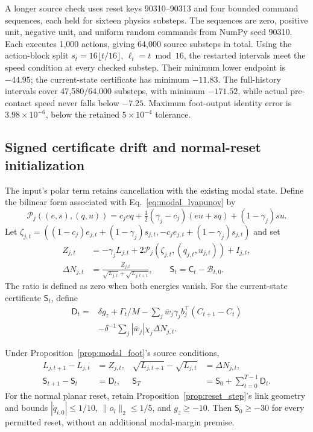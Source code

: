 A longer source check uses reset keys 90310--90313 and four bounded command sequences, each held for sixteen physics substeps.
The sequences are zero, positive unit, negative unit, and uniform random commands from NumPy seed 90310.
Each executes 1,000 actions, giving 64,000 source substeps in total.
Using the action-block split $s_t=16\lfloor t/16\rfloor$, $\ell_t=t\bmod16$, the restarted intervals meet the speed condition at every checked substep.
Their minimum lower endpoint is $-44.95$; the current-state certificate has minimum $-11.83$.
The full-history intervals cover 47,580/64,000 substeps, with minimum $-171.52$, while actual pre-contact speed never falls below $-7.25$.
Maximum foot-output identity error is $3.98\times10^{-6}$, below the retained $5\times10^{-4}$ tolerance.

\subsection{Signed certificate drift and normal-reset initialization}
\label{app:modal_drift}

The input's polar term retains cancellation with the existing modal state.
Define the bilinear form associated with Eq.~\eqref{eq:modal_lyapunov} by
\begin{equation}
 \mathcal P_j((e,s),(q,u))
 =c_jeq+\tfrac12(\gamma_j-c_j)(eu+sq)+(1-\gamma_j)su.
\end{equation}
Let $\zeta_{j,t}=((1-c_j)e_{j,t}+(1-\gamma_j)s_{j,t},-c_je_{j,t}+(1-\gamma_j)s_{j,t})$ and set
\begin{align}
 Z_{j,t}&=-\gamma_jL_{j,t}
   +2\mathcal P_j(\zeta_{j,t},(q_{j,t},u_{j,t}))+I_{j,t},\nonumber\\
 \Delta N_{j,t}&=\frac{Z_{j,t}}{\sqrt{L_{j,t}}+\sqrt{L_{j,t+1}}},
 \qquad \mathsf S_t=\mathsf C_t-\mathcal B_{t,0}.
 \label{eq:modal_signed_gain}
\end{align}
The ratio is defined as zero when both energies vanish.
For the current-state certificate $\mathsf S_t$, define
\begin{align}
 \mathsf D_t={}&\delta g_z+\Gamma_t/M
   -\sum_j\bar w_j\gamma_j b_j^\top(C_{t+1}-C_t)\nonumber\\
 &-\delta^{-1}\sum_j|\bar w_j|\chi_j\Delta N_{j,t}.
 \label{eq:modal_local_drift}
\end{align}

\begin{proposition}
\label{prop:modal_drift}
Under Proposition~\ref{prop:modal_foot}'s source conditions,
\begin{align}
 L_{j,t+1}-L_{j,t}&=Z_{j,t},
 &\sqrt{L_{j,t+1}}-\sqrt{L_{j,t}}&=\Delta N_{j,t},\nonumber\\
 \mathsf S_{t+1}-\mathsf S_t&=\mathsf D_t,
 &\mathsf S_T&=\mathsf S_0+\sum_{t=0}^{T-1}\mathsf D_t.
 \label{eq:modal_signed_trajectory}
\end{align}
For the normal planar reset, retain Proposition~\ref{prop:reset_step}'s link geometry and bounds
$|\dot q_{i,0}|\le1/10$, $\|o_i\|_2\le1/5$, and $g_z\ge-10$.
Then $\mathsf S_0\ge-30$ for every permitted reset, without an additional modal-margin premise.
\end{proposition}

